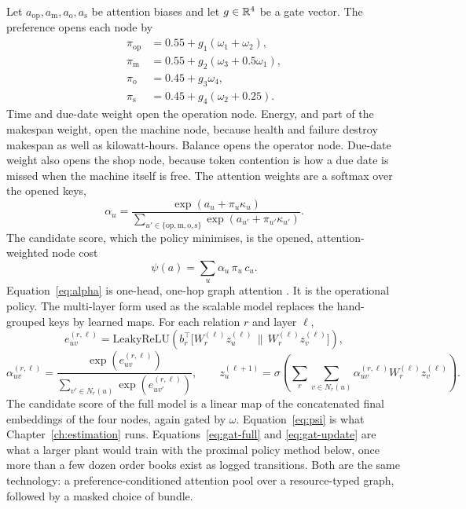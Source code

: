 Let \(a_{\mathrm{op}}, a_{\mathrm{m}}, a_{\mathrm{o}}, a_{\mathrm{s}}\) be attention biases and let \(g \in \mathbb{R}^4\) be a gate vector. The preference opens each node by
\begin{align}
\pi_{\mathrm{op}} &= 0.55 + g_1(\omega_1 + \omega_2) , \label{eq:open-op}\\
\pi_{\mathrm{m}} &= 0.55 + g_2(\omega_3 + 0.5\omega_1) , \label{eq:open-m}\\
\pi_{\mathrm{o}} &= 0.45 + g_3 \omega_4 , \label{eq:open-o}\\
\pi_{\mathrm{s}} &= 0.45 + g_4(\omega_2 + 0.25) . \label{eq:open-s}
\end{align}
Time and due-date weight open the operation node. Energy, and part of the makespan weight, open the machine node, because health and failure destroy makespan as well as kilowatt-hours. Balance opens the operator node. Due-date weight also opens the shop node, because token contention is how a due date is missed when the machine itself is free. The attention weights are a softmax over the opened keys,
\begin{equation}
\alpha_u = \frac{\exp(a_u + \pi_u \kappa_u)}{\sum_{u' \in \{\mathrm{op,m,o,s}\}} \exp(a_{u'} + \pi_{u'} \kappa_{u'})} .
\label{eq:alpha}
\end{equation}
The candidate score, which the policy minimises, is the opened, attention-weighted node cost
\begin{equation}
\psi(a) = \sum_u \alpha_u \, \pi_u \, c_u .
\label{eq:psi}
\end{equation}
Equation~\eqref{eq:alpha} is one-head, one-hop graph attention \cite{velickovic2018}. It is the operational policy. The multi-layer form used as the scalable model replaces the hand-grouped keys by learned maps. For each relation \(r\) and layer \(\ell\),
\begin{equation}
e_{uv}^{(r,\ell)} = \mathrm{LeakyReLU}\!\left(b_r^{\top}\big[W_r^{(\ell)} z_u^{(\ell)} \,\|\, W_r^{(\ell)} z_v^{(\ell)}\big]\right) ,
\label{eq:gat-full}
\end{equation}
\begin{equation}
\alpha_{uv}^{(r,\ell)} = \frac{\exp(e_{uv}^{(r,\ell)})}{\sum_{v' \in N_r(u)} \exp(e_{uv'}^{(r,\ell)})} ,
\qquad
z_u^{(\ell+1)} = \sigma\!\left(\sum_r \sum_{v \in N_r(u)} \alpha_{uv}^{(r,\ell)} W_r^{(\ell)} z_v^{(\ell)}\right) .
\label{eq:gat-update}
\end{equation}
The candidate score of the full model is a linear map of the concatenated final embeddings of the four nodes, again gated by \(\omega\). Equation~\eqref{eq:psi} is what Chapter~\ref{ch:estimation} runs. Equations~\eqref{eq:gat-full} and \eqref{eq:gat-update} are what a larger plant would train with the proximal policy method below, once more than a few dozen order books exist as logged transitions. Both are the same technology: a preference-conditioned attention pool over a resource-typed graph, followed by a masked choice of bundle.

